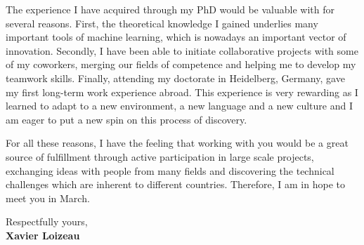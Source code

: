 \documentclass[11pt]{article}
\begin{document}
\medskip

The experience I have acquired through my PhD would be valuable with for several reasons.
First, the theoretical knowledge I gained underlies many important tools of machine learning, which is nowadays an important vector of innovation.
Secondly, I have been able to initiate collaborative projects with some of my coworkers, merging our fields of competence and helping me to develop my teamwork skills.
Finally, attending my doctorate in Heidelberg, Germany, gave my first long-term work experience abroad.
This experience is very rewarding as I learned to adapt to a new environment, a new language and a new culture and I am eager to put a new spin on this process of discovery.

\medskip

For all these reasons, I have the feeling that working with you would be a great source of fulfillment through active participation in large scale projects, exchanging ideas with people from many fields and discovering the technical challenges which are inherent to different countries.
Therefore, I am in hope to meet you in March.

\medskip
Respectfully yours,\\[2em] %
%
{\bfseries Xavier Loizeau}\\
%
\vfill%
\end{document}
